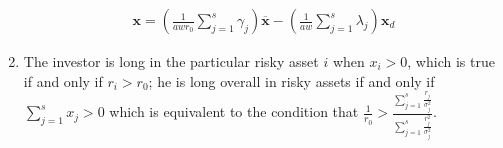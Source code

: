 \documentclass[10pt,handout]{beamer}
\newcommand{\ds}{\displaystyle}
\theoremstyle{definition}
\begin{document}
\begin{frame}[allowframebreaks]
\begin{enumerate}
      \begin{align*}
        \mathbf{x} = \left(\frac{1}{awr_0}\sum_{j=1}^s \gamma_j\right)\overline{\mathbf{x}} - \left(\frac{1}{aw}\sum_{j=1}^s \lambda_j\right)\mathbf{x}_d
      \end{align*}
    \item 
      The investor is long in the particular risky asset $i$ when $x_i > 0$, which is true if and only if $r_i > r_0$; he is long overall in risky assets if and only if $\ds\sum_{j=1}^s x_j > 0$ which is equivalent to the condition that $\ds\frac{1}{r_0} > \frac{\sum_{j=1}^s\frac{r_j}{\sigma_j^2}}{\sum_{j=1}^s\frac{r_j^2}{\sigma_j^2}}$.
  \end{enumerate}
\end{frame}

%  
%  
\end{document}
